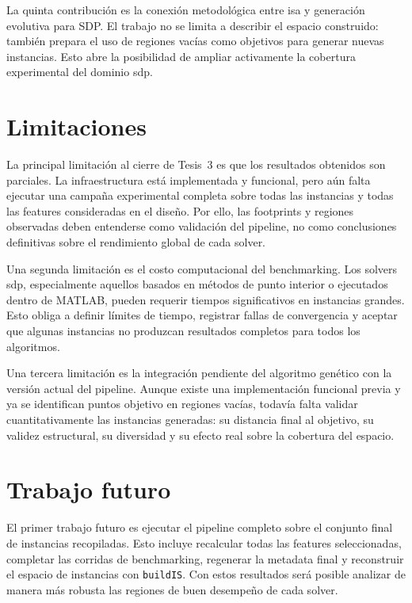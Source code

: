 La quinta contribución es la conexión metodológica entre \acrshort{isa} y generación
evolutiva para SDP.
El trabajo no se limita a describir el espacio construido: también prepara el uso de
regiones vacías como objetivos para generar nuevas instancias.
Esto abre la posibilidad de ampliar activamente la cobertura experimental del dominio
\acrshort{sdp}.

\section{Limitaciones}
\label{sec:conclusiones_limitaciones}

La principal limitación al cierre de Tesis~3 es que los resultados obtenidos son
parciales.
La infraestructura está implementada y funcional, pero aún falta ejecutar una campaña
experimental completa sobre todas las instancias y todas las features consideradas en
el diseño.
Por ello, las footprints y regiones observadas deben entenderse como validación del
pipeline, no como conclusiones definitivas sobre el rendimiento global de cada solver.

Una segunda limitación es el costo computacional del benchmarking.
Los solvers \acrshort{sdp}, especialmente aquellos basados en métodos de punto
interior o ejecutados dentro de MATLAB, pueden requerir tiempos significativos en
instancias grandes.
Esto obliga a definir límites de tiempo, registrar fallas de convergencia y aceptar
que algunas instancias no produzcan resultados completos para todos los algoritmos.

Una tercera limitación es la integración pendiente del algoritmo genético con la
versión actual del pipeline.
Aunque existe una implementación funcional previa y ya se identifican puntos objetivo
en regiones vacías, todavía falta validar cuantitativamente las instancias generadas:
su distancia final al objetivo, su validez estructural, su diversidad y su efecto real
sobre la cobertura del espacio.

\section{Trabajo futuro}
\label{sec:conclusiones_trabajo_futuro}

El primer trabajo futuro es ejecutar el pipeline completo sobre el conjunto final de
instancias recopiladas.
Esto incluye recalcular todas las features seleccionadas, completar las corridas de
benchmarking, regenerar la metadata final y reconstruir el espacio de instancias con
\texttt{buildIS}.
Con estos resultados será posible analizar de manera más robusta las regiones de buen
desempeño de cada solver.

